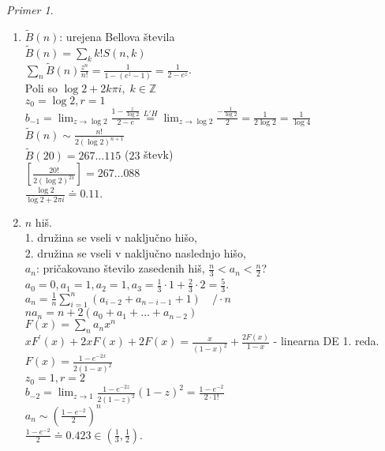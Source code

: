 \documentclass[a4paper, 12pt]{book}
\theoremstyle{definition}
\theoremstyle{remark}
\newtheorem*{ex}{Primer}
\newcommand{\Z}{\mathbb{Z}}
\begin{document}
\begin{ex}
\begin{enumerate}[label=(\arabic*)]
    \item $\tilde{B}(n)$: urejena Bellova števila \\
      $\tilde{B}(n) = \sum_k k! S(n,k)$ \\
      $\sum_n \tilde{B}(n) \frac{z^n}{n!} = \frac{1}{1 - (e^z-1)} = \frac{1}{2-e^z}$. \\
      Poli so $\log 2 + 2 k \pi i, \; k \in \Z$ \\
      $z_0 = \log 2, r = 1$ \\
      $b_{-1} = \lim_{z \to \log 2} \frac{1 - \frac{z}{\log 2}}{2 - e} \stackrel{L'H}{=}
      \lim_{z \to \log 2} \frac{-\frac{1}{\log 2}}{2} = \frac{1}{2 \log 2} = \frac{1}{\log 4}$ \\
      $\tilde{B}(n) \sim \frac{n!}{2 (\log 2)^{n+1}}$ \\
      $\tilde{B}(20) = 267 \dots 115$ ($23$ števk) \\
      $\left[\frac{20!}{2 (\log 2)^{21}}\right] = 267 \dots 088$ \\
      $\frac{\log 2}{\log 2 + 2 \pi i} \doteq 0.11$.
    \item $n$ hiš. \\
      1. družina se vseli v naključno hišo, \\
      2. družina se vseli v naključno naslednjo hišo, \\
      $a_n$: pričakovano število zasedenih hiš, $\frac{n}{3} < a_n < \frac{n}{2}$? \\
      $a_0 = 0, a_1 = 1, a_2 = 1, a_3 = \frac{1}{3} \cdot 1 + \frac{2}{3} \cdot 2 = \frac{5}{3}$. \\
      $a_n = \frac{1}{n} \sum_{i=1}^{n} (a_{i-2} + a_{n-i-1} + 1) \quad / \cdot n$ \\
      $n a_n = n + 2(a_0 + a_1 + \dots + a_{n-2})$ \\
      $F(x) = \sum_n a_n x^n$ \\
      $x F^{'}(x) + 2 x F(x) + 2 F(x) = \frac{x}{(1-x)^2} + \frac{2 F(x)}{1-x}$ - linearna DE 1. reda. \\
      $F(x) = \frac{1 - e^{-2x}}{2 (1-x)^2}$ \\
      $z_0 = 1, r = 2$ \\
      $b_{-2} = \lim_{z \to 1} \frac{1 - e^{-2z}}{2 (1-z)^2} (1-z)^2 = \frac{1 - e^{-2}}{2 \cdot 1!}$ \\
      $a_n \sim \left(\frac{1-e^{-2}}{2}\right)^n$ \\
      $\frac{1-e^{-2}}{2} \doteq 0.423 \in \left(\frac{1}{3}, \frac{1}{2}\right)$.
  \end{enumerate}
\end{ex}
\end{document}
